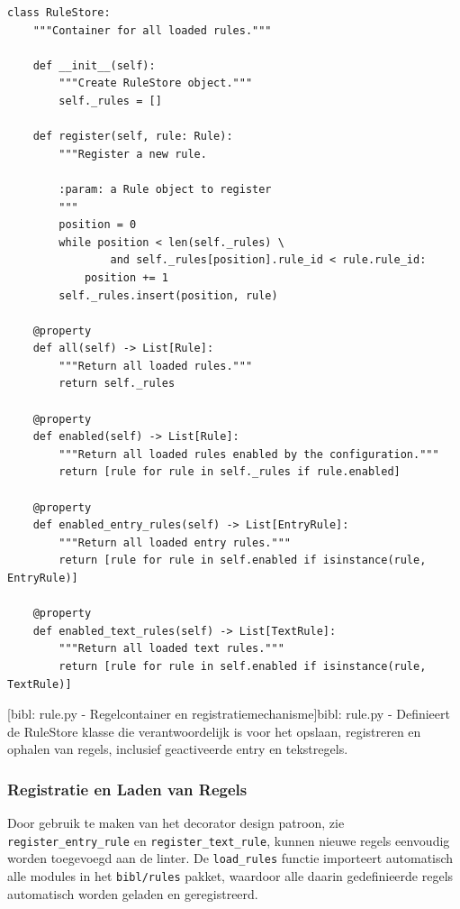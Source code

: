 \begin{verbatim}
class RuleStore:
    """Container for all loaded rules."""

    def __init__(self):
        """Create RuleStore object."""
        self._rules = []

    def register(self, rule: Rule):
        """Register a new rule.

        :param: a Rule object to register
        """
        position = 0
        while position < len(self._rules) \
                and self._rules[position].rule_id < rule.rule_id:
            position += 1
        self._rules.insert(position, rule)

    @property
    def all(self) -> List[Rule]:
        """Return all loaded rules."""
        return self._rules

    @property
    def enabled(self) -> List[Rule]:
        """Return all loaded rules enabled by the configuration."""
        return [rule for rule in self._rules if rule.enabled]

    @property
    def enabled_entry_rules(self) -> List[EntryRule]:
        """Return all loaded entry rules."""
        return [rule for rule in self.enabled if isinstance(rule, EntryRule)]

    @property
    def enabled_text_rules(self) -> List[TextRule]:
        """Return all loaded text rules."""
        return [rule for rule in self.enabled if isinstance(rule, TextRule)]
\end{verbatim}
[bibl: rule.py - Regelcontainer en registratiemechanisme]{bibl: rule.py - Definieert de RuleStore klasse die verantwoordelijk is voor het opslaan, registreren en ophalen van regels, inclusief geactiveerde entry en tekstregels. \label{lst:bibl_rule_store}}

\subsubsection{Registratie en Laden van Regels}

Door gebruik te maken van het decorator design patroon, zie \texttt{register\_entry\_rule} en \texttt{register\_text\_rule}, kunnen nieuwe regels eenvoudig worden toegevoegd aan de linter. De \texttt{load\_rules} functie importeert automatisch alle modules in het \texttt{bibl/rules} pakket, waardoor alle daarin gedefinieerde regels automatisch worden geladen en geregistreerd.

